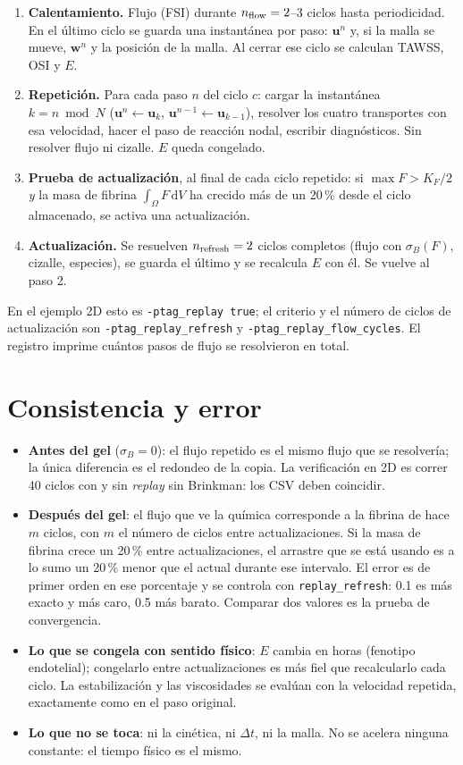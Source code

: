 \documentclass[11pt,a4paper]{article}
\newcommand{\bu}{\bm{u}}
\begin{document}
\begin{enumerate}[leftmargin=1.6em]
\item \textbf{Calentamiento.} Flujo (FSI) durante $n_{\rm flow}=2$--3 ciclos hasta periodicidad. En el último ciclo se guarda una instantánea por paso: $\bu^n$ y, si la malla se mueve, $\bm w^n$ y la posición de la malla. Al cerrar ese ciclo se calculan TAWSS, OSI y $E$.
\item \textbf{Repetición.} Para cada paso $n$ del ciclo $c$: cargar la instantánea $k=n\bmod N$ ($\bu^n\leftarrow\bu_k$, $\bu^{n-1}\leftarrow\bu_{k-1}$), resolver los cuatro transportes con esa velocidad, hacer el paso de reacción nodal, escribir diagnósticos. Sin resolver flujo ni cizalle. $E$ queda congelado.
\item \textbf{Prueba de actualización}, al final de cada ciclo repetido: si $\max F>K_F/2$ \emph{y} la masa de fibrina $\int_\Omega F\,\mathrm dV$ ha crecido más de un 20\,\% desde el ciclo almacenado, se activa una actualización.
\item \textbf{Actualización.} Se resuelven $n_{\rm refresh}=2$ ciclos completos (flujo con $\sigma_B(F)$, cizalle, especies), se guarda el último y se recalcula $E$ con él. Se vuelve al paso 2.
\end{enumerate}
En el ejemplo 2D esto es \texttt{-ptag\_replay true}; el criterio y el número de ciclos de actualización son \texttt{-ptag\_replay\_refresh} y \texttt{-ptag\_replay\_flow\_cycles}. El registro imprime cuántos pasos de flujo se resolvieron en total.

\section{Consistencia y error}

\begin{itemize}[leftmargin=1.4em]
\item \textbf{Antes del gel} ($\sigma_B=0$): el flujo repetido es el mismo flujo que se resolvería; la única diferencia es el redondeo de la copia. La verificación en 2D es correr 40 ciclos con y sin \emph{replay} sin Brinkman: los CSV deben coincidir.
\item \textbf{Después del gel}: el flujo que ve la química corresponde a la fibrina de hace $m$ ciclos, con $m$ el número de ciclos entre actualizaciones. Si la masa de fibrina crece un 20\,\% entre actualizaciones, el arrastre que se está usando es a lo sumo un 20\,\% menor que el actual durante ese intervalo. El error es de primer orden en ese porcentaje y se controla con \texttt{replay\_refresh}: 0.1 es más exacto y más caro, 0.5 más barato. Comparar dos valores es la prueba de convergencia.
\item \textbf{Lo que se congela con sentido físico}: $E$ cambia en horas (fenotipo endotelial); congelarlo entre actualizaciones es más fiel que recalcularlo cada ciclo. La estabilización y las viscosidades se evalúan con la velocidad repetida, exactamente como en el paso original.
\item \textbf{Lo que no se toca}: ni la cinética, ni $\Delta t$, ni la malla. No se acelera ninguna constante: el tiempo físico es el mismo.
\end{itemize}
\end{document}

